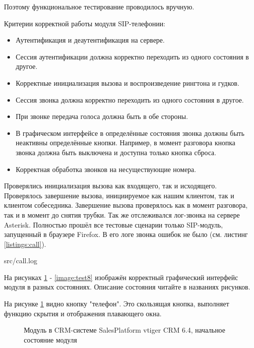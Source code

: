 Поэтому функциональное тестирование проводилось вручную.

Критерии корректной работы модуля SIP-телефонии:
\begin{itemize}
\item Аутентификация и деаутентификация на сервере.
\item Сессия аутентификации должна корректно переходить из одного состояния в другое.
\item Корректные инициализация вызова и воспроизведение рингтона и гудков.
\item Сессия звонка должна корректно переходить из одного состояния в другое.
\item При звонке передача голоса должна быть в обе стороны.
\item В графическом интерфейсе в определённые состояния звонка должны быть неактивны определённые кнопки. Например, в момент разговора кнопка звонка должна быть выключена и доступна только кнопка сброса.
\item Корректная обработка звонков на несуществующие номера.
\end{itemize}

Проверялись инициализация вызова как входящего, так и исходящего. Проверялось завершение вызова, инициируемое как нашим клиентом, так и клиентом собеседника. Завершение вызова проверялось как в момент разговора, так и в момент до снятия трубки. Так же отслеживался лог-звонка на сервере Asterisk. Полностью прошёл все тестовые сценарии только SIP-модуль, запущенный в браузере Firefox. В его логе звонка ошибок не было (см. листинг \ref{listings:call}).


{src/call.log}

На рисунках \ref{image:test1} - \ref{image:test8} изображён корректный графический интерфейс модуля в разных состояниях. Описание состояния читайте в названиях рисунков.

На рисунке \ref{image:test1} видно кнопку "телефон". Это скользящая кнопка, выполняет функцию скрытия и отображения плавающего окна.

\begin{figure}[h!]
\caption{Модуль в CRM-системе SalesPlatform vtiger CRM 6.4, начальное состояние модуля}
\label{image:test1}
\end{figure}

